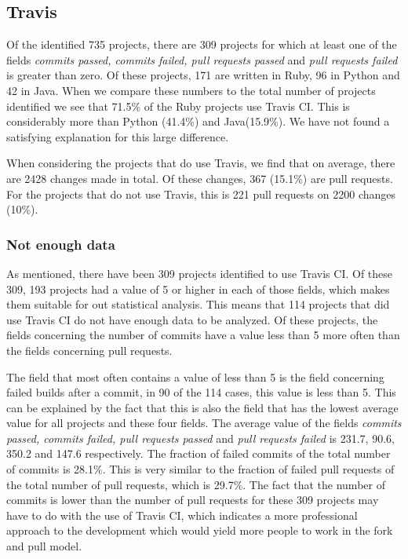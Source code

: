\subsection{Travis}
Of the identified 735 projects, there are 309 projects for which at least one of the fields \textit{commits passed, commits failed, pull requests passed} and \textit{pull requests failed} is greater than zero. 
Of these projects, 171 are written in Ruby, 96 in Python and 42 in Java. 
When we compare these numbers to the total number of projects identified we see that 71.5\% of the Ruby projects use Travis CI.
This is considerably more than Python (41.4\%) and Java(15.9\%).
We have not found a satisfying explanation for this large difference.

When considering the projects that do use Travis, we find that on average, there are 2428 changes made in total. 
Of these changes, 367 (15.1\%) are pull requests.
For the projects that do not use Travis, this is 221 pull requests on 2200 changes (10\%).


\subsubsection*{Not enough data}
As mentioned, there have been 309 projects identified to use Travis CI.
Of these 309, 193 projects had a value of 5 or higher in each of those fields, which makes them suitable for out statistical analysis.
This means that 114 projects that did use Travis CI do not have enough data to be analyzed. 
Of these projects, the fields concerning the number of commits have a value less than 5 more often than the fields concerning pull requests.

The field that most often contains a value of less than 5 is the field concerning failed builds after a commit, in 90 of the 114 cases, this value is less than 5.
This can be explained by the fact that this is also the field that has the lowest average value for all projects and these four fields. 
The average value of the fields \textit{commits passed, commits failed, pull requests passed} and \textit{pull requests failed} is 231.7, 90.6, 350.2 and 147.6 respectively.
The fraction of failed commits of the total number of commits is 28.1\%. This is very similar to the fraction of failed pull requests of the total number of pull requests, which is 29.7\%.
The fact that the number of commits is lower than the number of pull requests for these 309 projects may have to do with the use of Travis CI, which indicates a more professional approach to the development which would yield more people to work in the fork and pull model.

